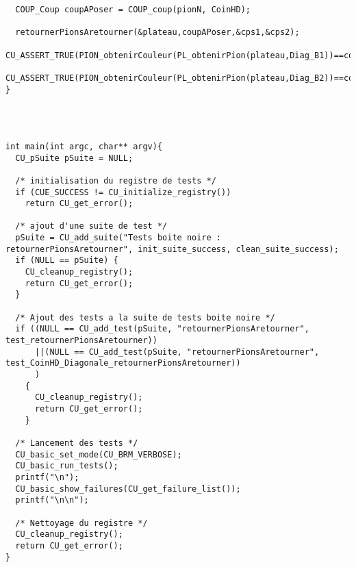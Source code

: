 \begin{lstlisting}
  COUP_Coup coupAPoser = COUP_coup(pionN, CoinHD);

  retournerPionsAretourner(&plateau,coupAPoser,&cps1,&cps2);
  CU_ASSERT_TRUE(PION_obtenirCouleur(PL_obtenirPion(plateau,Diag_B1))==couleur_n);
  CU_ASSERT_TRUE(PION_obtenirCouleur(PL_obtenirPion(plateau,Diag_B2))==couleur_n);
}




int main(int argc, char** argv){
  CU_pSuite pSuite = NULL;

  /* initialisation du registre de tests */
  if (CUE_SUCCESS != CU_initialize_registry())
    return CU_get_error();

  /* ajout d'une suite de test */
  pSuite = CU_add_suite("Tests boite noire : retournerPionsAretourner", init_suite_success, clean_suite_success);
  if (NULL == pSuite) {
    CU_cleanup_registry();
    return CU_get_error();
  }

  /* Ajout des tests a la suite de tests boite noire */
  if ((NULL == CU_add_test(pSuite, "retournerPionsAretourner", test_retournerPionsAretourner))
      ||(NULL == CU_add_test(pSuite, "retournerPionsAretourner", test_CoinHD_Diagonale_retournerPionsAretourner))
      )
    {
      CU_cleanup_registry();
      return CU_get_error();
    }

  /* Lancement des tests */
  CU_basic_set_mode(CU_BRM_VERBOSE);
  CU_basic_run_tests();
  printf("\n");
  CU_basic_show_failures(CU_get_failure_list());
  printf("\n\n");

  /* Nettoyage du registre */
  CU_cleanup_registry();
  return CU_get_error();
}
\end{lstlisting}


